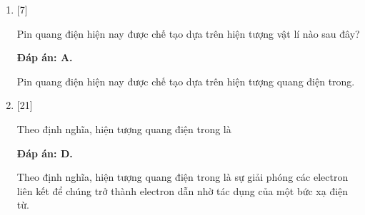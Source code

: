 \begin{enumerate}[label=\bfseries Câu \arabic*:]
{		Cặp nhiệt điện không làm từ chất bán dẫn.
	}
	
	\item {} [7]
	\cauhoi
	{Pin quang điện hiện nay được chế tạo dựa trên hiện tượng vật lí nào sau đây?
	}
	
	\loigiai
	{		\textbf{Đáp án: A.}
		
		Pin quang điện hiện nay được chế tạo dựa trên hiện tượng quang điện trong.
	}
	
	\item {} [21]
	\cauhoi
	{Theo định nghĩa, hiện tượng quang điện trong là
	}
	
	\loigiai
	{		\textbf{Đáp án: D.}
		
		Theo định nghĩa, hiện tượng quang điện trong là sự giải phóng các electron liên kết để chúng trở thành electron dẫn nhờ tác dụng của một bức xạ điện từ.
	}
	
\end{enumerate}

